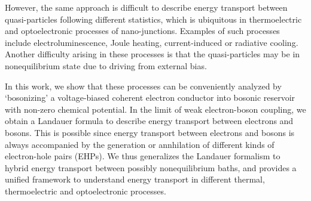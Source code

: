 \documentclass[aps,prb,
,floatfix,footinbib,shortbibliography,
preprint
]{revtex4-1}
\begin{document}
However, the same approach is difficult to describe energy transport between quasi-particles following different statistics, which is ubiquitous in thermoelectric and optoelectronic processes of nano-junctions. Examples of such processes include electroluminescence\cite{kuhnke2017atomic,galeprin2017photonics,schneider2010optical,schneider2012light}, Joule heating\cite{huang2007local,ioffe2008detection,lu_current-induced_2015,hartle2011resonant,hartle2011vibrational,hartle2018cooling}, current-induced\cite{galperin2009cooling,simine2012vibrational,lykkebo2016single,hartle2011resonant} or radiative cooling\cite{zhu2019near}. Another difficulty arising in these processes is that the quasi-particles may be in nonequilibrium state due to driving from external bias.

In this work, we show that these processes can be conveniently analyzed by `bosonizing' a voltage-biased coherent electron conductor into bosonic reservoir with non-zero chemical potential. In the limit of weak electron-boson coupling, we obtain a Landauer formula to describe energy transport between electrons and bosons. This is possible since energy transport between electrons and bosons is always accompanied by the generation or annhilation of different kinds of electron-hole pairs (EHPs)\cite{headgordon_molecular_1995,dou2018perspective}. We thus generalizes the Landauer formalism to hybrid energy transport between possibly nonequilibrium baths, and provides a unified framework to understand energy transport in different thermal, thermoelectric and optoelectronic processes.  

\end{document}
